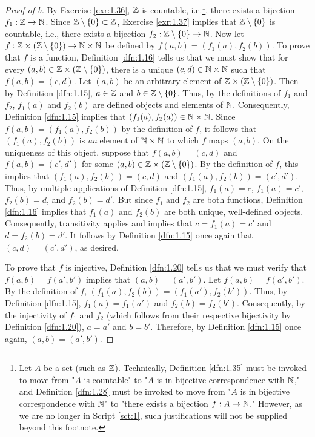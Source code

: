 \documentclass[../main.tex]{subfiles}
\begin{document}
\begin{theorem}
\begin{lemma*}
\begin{proof}[Proof of b]
            By Exercise \ref{exr:1.36}, $\mathbb{Z}$ is countable, i.e.\footnote{Let $A$ be a set (such as $\mathbb{Z}$). Technically, Definition \ref{dfn:1.35} must be invoked to move from "$A$ is countable" to "$A$ is in bijective correspondence with $\mathbb{N}$," and Definition \ref{dfn:1.28} must be invoked to move from "$A$ is in bijective correspondence with $\mathbb{N}$" to "there exists a bijection $f:A\to\mathbb{N}$." However, as we are no longer in Script \ref{sct:1}, such justifications will not be supplied beyond this footnote.}, there exists a bijection $f_1:\mathbb{Z}\to\mathbb{N}$. Since $\mathbb{Z}\setminus\{0\}\subset\mathbb{Z}$, Exercise \ref{exr:1.37} implies that $\mathbb{Z}\setminus\{0\}$ is countable, i.e., there exists a bijection $f_2:\mathbb{Z}\setminus\{0\}\to\mathbb{N}$. Now let $f:\mathbb{Z}\times(\mathbb{Z}\setminus\{0\})\to\mathbb{N}\times\mathbb{N}$ be defined by $f(a,b)=(f_1(a),f_2(b))$. To prove that $f$ is a function, Definition \ref{dfn:1.16} tells us that we must show that for every $(a,b)\in\mathbb{Z}\times(\mathbb{Z}\setminus\{0\})$, there is a unique $(c,d)\in\mathbb{N}\times\mathbb{N}$ such that $f(a,b)=(c,d)$. Let $(a,b)$ be an arbitrary element of $\mathbb{Z}\times(\mathbb{Z}\setminus\{0\})$. Then by Definition \ref{dfn:1.15}, $a\in\mathbb{Z}$ and $b\in\mathbb{Z}\setminus\{0\}$. Thus, by the definitions of $f_1$ and $f_2$, $f_1(a)$ and $f_2(b)$ are defined objects and elements of $\mathbb{N}$. Consequently, Definition \ref{dfn:1.15} implies that $(f_1(a),f_2(a))\in\mathbb{N}\times\mathbb{N}$. Since $f(a,b)=(f_1(a),f_2(b))$ by the definition of $f$, it follows that $(f_1(a),f_2(b))$ is \emph{an} element of $\mathbb{N}\times\mathbb{N}$ to which $f$ maps $(a,b)$. On the uniqueness of this object, suppose that $f(a,b)=(c,d)$ and $f(a,b)=(c',d')$ for some $(a,b)\in\mathbb{Z}\times(\mathbb{Z}\setminus\{0\})$. By the definition of $f$, this implies that $(f_1(a),f_2(b))=(c,d)$ and $(f_1(a),f_2(b))=(c',d')$. Thus, by multiple applications of Definition \ref{dfn:1.15}, $f_1(a)=c$, $f_1(a)=c'$, $f_2(b)=d$, and $f_2(b)=d'$. But since $f_1$ and $f_2$ are both functions, Definition \ref{dfn:1.16} implies that $f_1(a)$ and $f_2(b)$ are both unique, well-defined objects. Consequently, transitivity applies and implies that $c=f_1(a)=c'$ and $d=f_2(b)=d'$. It follows by Definition \ref{dfn:1.15} once again that $(c,d)=(c',d')$, as desired.\par
            To prove that $f$ is injective, Definition \ref{dfn:1.20} tells us that we must verify that $f(a,b)=f(a',b')$ implies that $(a,b)=(a',b')$. Let $f(a,b)=f(a',b')$. By the definition of $f$, $(f_1(a),f_2(b))=(f_1(a'),f_2(b'))$. Thus, by Definition \ref{dfn:1.15}, $f_1(a)=f_1(a')$ and $f_2(b)=f_2(b')$. Consequently, by the injectivity of $f_1$ and $f_2$ (which follows from their respective bijectivity by Definition \ref{dfn:1.20}), $a=a'$ and $b=b'$. Therefore, by Definition \ref{dfn:1.15} once again, $(a,b)=(a',b')$.\par

\end{proof}
\end{lemma*}
\end{theorem}
\end{document}

